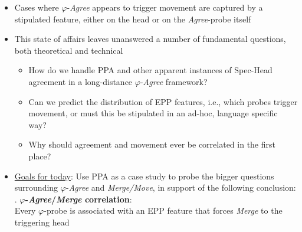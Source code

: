 \documentclass[11pt, letterpaper]{paper_nick}
\begin{document}
\begin{itemize}
\item Cases where $\varphi$-\emph{Agree} appears to trigger movement are captured by a stipulated feature, either on the head or on the \emph{Agree}-probe itself\\
\item This state of affairs leaves unanswered a number of fundamental questions, both theoretical and technical
\begin{itemize}
\item How do we handle PPA and other apparent instances of Spec-Head agreement in a long-distance $\varphi$-\emph{Agree} framework?
\item Can we predict the distribution of EPP features, i.e., which probes trigger movement, or must this be stipulated in an ad-hoc, language specific way?
\item Why should agreement and movement ever be correlated in the first place? 
\end{itemize}
\item \underline{Goals for today}: Use PPA as a case study to probe the bigger questions surrounding $\varphi$-\emph{Agree} and \emph{Merge/Move}, in support of the following conclusion:
\ex. \textbf{$\varphi$-\emph{Agree}/\emph{Merge} correlation}:\\
Every $\varphi$-probe is associated with an EPP feature that forces \emph{Merge} to the triggering head 


\end{itemize}
\end{document}
